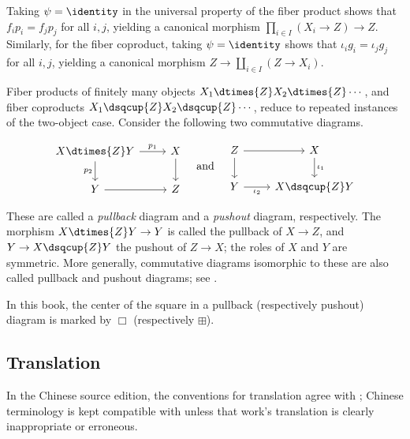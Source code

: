 Taking $\psi=\identity$ in the universal property of the fiber product shows that $f_ip_i=f_jp_j$ for all $i,j$, yielding a canonical morphism $\prod_{i\in I}(X_i\to Z)\to Z$. Similarly, for the fiber coproduct, taking $\psi=\identity$ shows that $\iota_ig_i=\iota_jg_j$ for all $i,j$, yielding a canonical morphism $Z\to\coprod_{i\in I}(Z\to X_i)$.

Fiber products of finitely many objects $X_1\dtimes{Z}X_2\dtimes{Z}\cdots$, and fiber coproducts $X_1\dsqcup{Z}X_2\dsqcup{Z}\cdots$, reduce to repeated instances of the two-object case. Consider the following two commutative diagrams.

\[\begin{tikzcd}
	X \dtimes{Z} Y \arrow[r, "p_1"] \arrow[d, "p_2"'] & X \arrow[d] \\
	Y \arrow[r] & Z
\end{tikzcd} \quad \text{and} \quad \begin{tikzcd}
	Z \arrow[r] \arrow[d] & X \arrow[d, "\iota_1"] \\
	Y \arrow[r, "\iota_2"'] & X \dsqcup{Z} Y
\end{tikzcd}\]

These are called a \emph{pullback} diagram and a \emph{pushout} diagram, respectively. The morphism $X\dtimes{Z}Y\to Y$ is called the pullback of $X\to Z$, and $Y\to X\dsqcup{Z}Y$ the pushout of $Z\to X$; the roles of $X$ and $Y$ are symmetric. More generally, commutative diagrams isomorphic to these are also called pullback and pushout diagrams; see \cite[Definition~2.8.5]{Li1}.

In this book, the center of the square in a pullback (respectively pushout) diagram is marked by $\Box$ (respectively $\boxplus$).

\subsection*{Translation}

In the Chinese source edition, the conventions for translation agree with \cite{Li1}; Chinese terminology is kept compatible with \cite{ZG} unless that work's translation is clearly inappropriate or erroneous.

